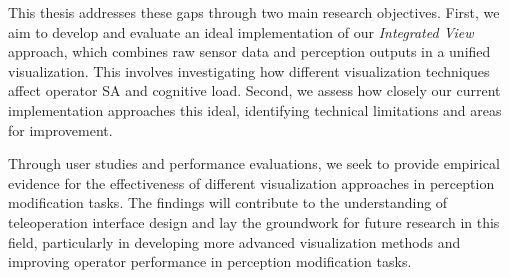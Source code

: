 This thesis addresses these gaps through two main research objectives. First, we aim to develop and evaluate an ideal implementation of our \emph{Integrated View} approach, which combines raw sensor data and perception outputs in a unified visualization. This involves investigating how different visualization techniques affect operator \ac{SA} and cognitive load. Second, we assess how closely our current implementation approaches this ideal, identifying technical limitations and areas for improvement.

Through user studies and performance evaluations, we seek to provide empirical evidence for the effectiveness of different visualization approaches in perception modification tasks. The findings will contribute to the understanding of teleoperation interface design and lay the groundwork for future research in this field, particularly in developing more advanced visualization methods and improving operator performance in perception modification tasks.



